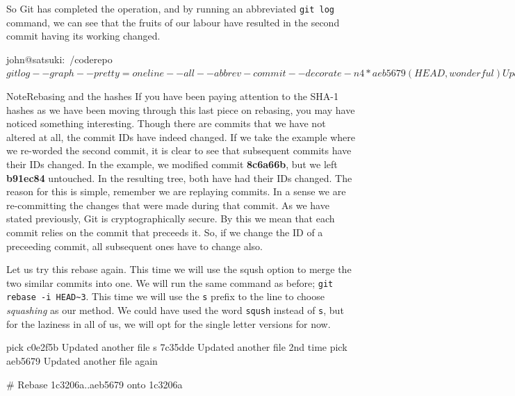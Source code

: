 So Git has completed the operation, and by running an abbreviated \texttt{git log} command, we can see that the fruits of our labour have resulted in the second commit having its working changed.

\begin{code}
john@satsuki:~/coderepo$ git log --graph --pretty=oneline --all
 --abbrev-commit --decorate -n 4
* aeb5679 (HEAD, wonderful) Updated another file again
* 7c35dde Updated another file 2nd time
* c0e2f5b Updated another file
* 1c3206a (master) Added a new file
john@satsuki:~/coderepo$
\end{code}

\begin{callout}{Note}{Rebasing and the hashes}
If you have been paying attention to the SHA-1 hashes as we have been moving through this last piece on rebasing, you may have noticed something interesting.
Though there are commits that we have not altered at all, the commit IDs have indeed changed.
If we take the example where we re-worded the second commit, it is clear to see that subsequent commits have their IDs changed.
In the example, we modified commit \textbf{8c6a66b}, but we left \textbf{b91ec84} untouched.
In the resulting tree, both have had their IDs changed.
\newline
\newline
The reason for this is simple, remember we are replaying commits.
In a sense we are re-committing the changes that were made during that commit.
As we have stated previously, Git is cryptographically secure.
By this we mean that each commit relies on the commit that preceeds it.
So, if we change the ID of a preceeding commit, all subsequent ones have to change also.
\end{callout}

Let us try this rebase again.
This time we will use the sqush option to merge the two similar commits into one.
We will run the same command as before; \texttt{git rebase -i HEAD\textasciitilde3}.
This time we will use the \texttt{s} prefix to the line to choose \emph{squashing} as our method.
We could have used the word \texttt{sqush} instead of \texttt{s}, but for the laziness in all of us, we will opt for the single letter versions for now.

\begin{code}
pick c0e2f5b Updated another file
s 7c35dde Updated another file 2nd time
pick aeb5679 Updated another file again

# Rebase 1c3206a..aeb5679 onto 1c3206a
\end{code}

